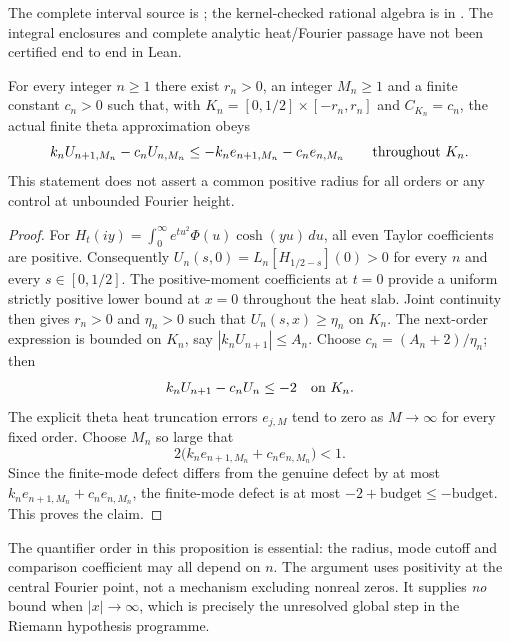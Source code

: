 The complete interval source is
;
the kernel-checked rational algebra is in
.
The integral enclosures and complete analytic
heat/Fourier passage have not been certified
end to end in Lean.


\begin{proposition}
\label{prop:allorderslocalrect}
For every integer $n\ge1$ there exist
$r_n>0$, an integer $M_n\ge1$ and
a finite constant $c_n>0$ such that,
with $K_n=[0,1/2]\times[-r_n,r_n]$
and $C_{K_n}=c_n$, the actual
finite theta approximation obeys
\[
k_nU_{n+1,M_n}-c_nU_{n,M_n}
\le-k_ne_{n+1,M_n}-c_ne_{n,M_n}
\qquad\hbox{throughout }K_n.
\]
This statement does not assert a
common positive radius for all orders
or any control at unbounded Fourier height.
\end{proposition}
\begin{proof}
For $H_t(iy)=\int_0^\infty
e^{tu^2}\Phi(u)\cosh(yu)\,du$,
all even Taylor coefficients are positive.
Consequently
$U_n(s,0)=L_n[H_{1/2-s}](0)>0$
for every $n$ and every $s\in[0,1/2]$.
The positive-moment coefficients
at $t=0$ provide a uniform strictly
positive lower bound at $x=0$
throughout the heat slab.
Joint continuity then gives $r_n>0$
and $\eta_n>0$ such that
$U_n(s,x)\ge\eta_n$ on $K_n$.
The next-order expression is bounded
on $K_n$, say $|k_nU_{n+1}|\le A_n$.
Choose
$c_n=(A_n+2)/\eta_n$; then
\[
k_nU_{n+1}-c_nU_n\le-2
\quad\hbox{on }K_n.
\]
The explicit theta heat truncation
errors $e_{j,M}$ tend to zero
as $M\to\infty$ for every fixed order.
Choose $M_n$ so large that
\[
2\bigl(k_ne_{n+1,M_n}
+c_ne_{n,M_n}\bigr)<1.
\]
Since the finite-mode defect differs
from the genuine defect by at most
$k_ne_{n+1,M_n}+c_ne_{n,M_n}$,
the finite-mode defect is at most
$-2+\mathrm{budget}\le-\mathrm{budget}$.
This proves the claim.
\end{proof}

The quantifier order in this proposition
is essential: the radius, mode cutoff
and comparison coefficient may all depend
on $n$. The argument uses positivity at
the central Fourier point, not a mechanism
excluding nonreal zeros. It supplies
\emph{no} bound when $|x|\to\infty$,
which is precisely the unresolved
global step in the Riemann hypothesis programme.

